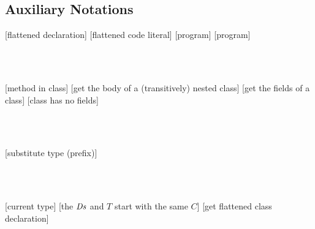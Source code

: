 \subsection{Auxiliary Notations}
\begin{grammar}
	\produ{\DF}{\cd{\id}{\LF}}[flattened declaration]
	[flattened code literal]
	[program]
	[program]
\end{grammar}
\\\\
\begin{defs}
	[method in class]
	[get the body of a (transitively) nested class]
	[get the fields of a class]
	[class has no fields]
\end{defs}
\\\\
\begin{defs}
	[substitute type (prefix)]
\end{defs}
\\\\
\begin{defs}
	[current type]
	[the $\mathit{Ds}$ and $T$ start with the same $C$]
	[get flattened class declaration]
\end{defs}
